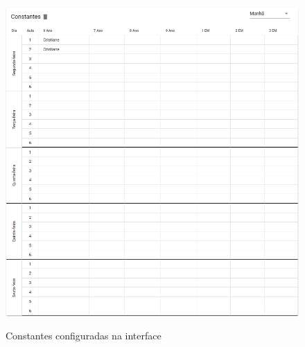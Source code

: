 \begin{figure}
	\centering
	\caption{Constantes configuradas na interface}
	\includegraphics[width=1\textwidth]{./dados/figuras/constantes_configuradas}
	\label{fig:constantes_configuradas}
\end{figure}

